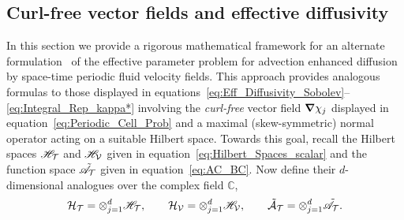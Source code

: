 \documentclass[amsa]{ipart}
\begin{document}
\subsection{Curl-free vector fields and effective diffusivity}
\label{sec:Curl_Free_Fields}
%
In this section we provide a rigorous mathematical framework for an
alternate formulation~\cite{Avellaneda:PRE:3249} of the effective
parameter problem for advection enhanced diffusion by space-time
periodic fluid velocity fields.  This approach provides analogous
formulas to those displayed in
equations~\eqref{eq:Eff_Diffusivity_Sobolev}--\eqref{eq:Integral_Rep_kappa*}
involving the \emph{curl-free} vector field $\mbox{\boldmath${\nabla}$}\chi_j$ displayed in
equation~\eqref{eq:Periodic_Cell_Prob} and a maximal (skew-symmetric)
normal operator acting on a suitable Hilbert space. Towards this goal,
recall the Hilbert spaces $\mathscr{H}_{\mathcal{T}}$ and $\mathscr{H}_{\mathcal{V}}$ given in
equation~\eqref{eq:Hilbert_Spaces_scalar} and the function space
$\tilde{\mathscr{A}}_{\mathcal{T}}$ given in equation~\eqref{eq:AC_BC}.
Now define
their $d$-dimensional analogues over the complex field $\mathbb{C}$,  
%
\begin{align}\label{eq:Hilbert_Spaces_vector}
  \Hc_{\Tc}=\otimes_{j=1}^d\Hs_{\Tc}, \qquad
  \Hc_{\Vc}=\otimes_{j=1}^d\Hs_{\Vc}, \qquad
  \tilde{\Ac}_{\Tc}=\otimes_{j=1}^d\tilde{\As}_{\Tc}.
\end{align}
%
\end{document}
